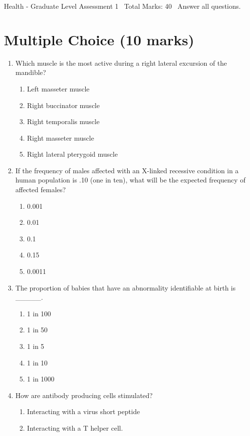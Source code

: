 \documentclass[12pt]{article}
\begin{document}
\begin{center}
Health - Graduate Level Assessment 1 \
Total Marks: 40 \
Answer all questions.
\end{center}

\section*{Multiple Choice (10 marks)}
\begin{enumerate}[label=\arabic*.]
\item Which muscle is the most active during a right lateral excursion of the mandible?
\begin{enumerate}[label=(\alph*)]
    \item Left masseter muscle
    \item Right buccinator muscle
    \item Right temporalis muscle
    \item Right masseter muscle
    \item Right lateral pterygoid muscle
\end{enumerate}
\item If the frequency of males affected with an X-linked recessive condition in a human
population is .10 (one in ten), what will be the expected frequency of affected females?
\begin{enumerate}[label=(\alph*)]
    \item 0.001
    \item 0.01
    \item 0.1
    \item 0.15
    \item 0.0011
\end{enumerate}
\item The proportion of babies that have an abnormality identifiable at birth is \_\_\_\_\_.
\begin{enumerate}[label=(\alph*)]
    \item 1 in 100
    \item 1 in 50
    \item 1 in 5
    \item 1 in 10
    \item 1 in 1000
\end{enumerate}
\item How are antibody producing cells stimulated?
\begin{enumerate}[label=(\alph*)]
    \item Interacting with a virus short peptide
    \item Interacting with a T helper cell.

\end{enumerate}
\end{enumerate}
\end{document}
